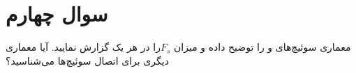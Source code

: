 \section{سوال چهارم}
معماری سوئیچ‌های  و  را توضیح داده و میزان $F_s$​ را در هر یک گزارش نمایید. آیا معماری دیگری برای اتصال سوئیچ‌ها می‌شناسید؟

\begin{qsolve}
	
\end{qsolve}